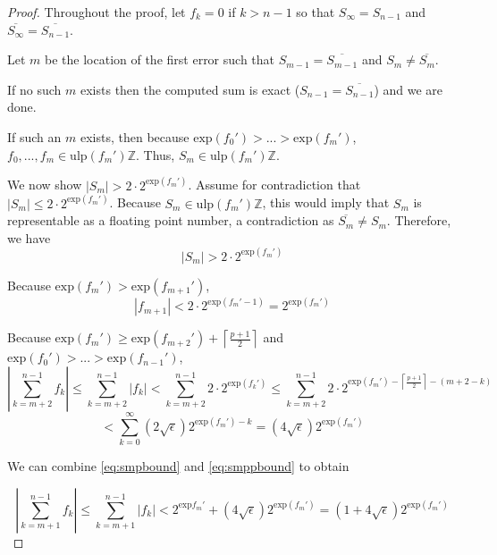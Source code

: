 \documentclass[12pt]{article}
\providecommand{\ceil}[1]{\left \lceil #1 \right \rceil }
\providecommand{\Z}{\ensuremath{\mathbb{Z}}}
\providecommand{\exp}{\ensuremath{\text{exp}}}
\providecommand{\ulp}{\ensuremath{\text{ulp}}}
\theoremstyle{definition}
\numberwithin{equation}{section}
\numberwithin{figure}{section}
\begin{document}
    \begin{proof}

      Throughout the proof, let $f_k = 0$ if $k > n - 1$ so that $S_{\infty} = S_{n - 1}$ and $\overline{S_{\infty}} = \overline{S_{n - 1}}$.

      Let $m$ be the location of the first error such that $S_{m - 1} = \overline{S_{m - 1}}$ and $S_{m} \neq \overline{S_{m}}$.

      If no such $m$ exists then the computed sum is exact ($S_{n - 1} = \overline{S_{n - 1}}$) and we are done.

      If such an $m$ exists, then because $\exp(f_0') > ... > \exp(f_m')$, $f_0, ..., f_m \in \ulp(f_m')\Z$. Thus, $S_m \in \ulp(f_m')\Z$.

      We now show $|S_m| > 2 \cdot 2^{\exp(f_m')}$. Assume for contradiction that $|S_m| \leq 2 \cdot 2^{\exp(f_m')}$. Because $S_m \in \ulp(f_m')\Z$, this would imply that $S_m$ is representable as a floating point number, a contradiction as $\overline{S_m} \neq S_m$. Therefore, we have
      \begin{equation}
        |S_m| > 2 \cdot 2^{\exp(f_m')}
        \label{eq:smbound}
      \end{equation}

      Because $\exp(f_m') > \exp(f_{m + 1}')$,
      \begin{equation}
        |f_{m + 1}| < 2\cdot2^{\exp(f_m' - 1)} = 2^{\exp(f_m')}
        \label{eq:smpbound}
      \end{equation}

      Because $\exp(f_m') \geq \exp(f_{m + 2}') + \ceil{\frac{p + 1}{2}}$ and $\exp(f_0') > ... > \exp(f_{n - 1}')$,
      \begin{equation*}
        |\sum \limits_{k = m + 2}^{n - 1} f_k| \leq \sum \limits_{k = m + 2}^{n - 1} |f_k| < \sum \limits_{k = m + 2}^{n - 1} 2 \cdot 2^{\exp(f_k')} \leq \sum \limits_{k = m + 2}^{n - 1} 2 \cdot 2^{\exp(f_m') - \ceil{\frac{p + 1}{2}} - (m + 2 - k)}
      \end{equation*}
      \begin{equation}
        < \sum \limits_{k = 0}^{\infty} (2 \sqrt{\epsilon})2^{\exp(f_m') - k} = (4\sqrt\epsilon)2^{\exp(f_m')}
        \label{eq:smppbound}
      \end{equation}

      We can combine  \eqref{eq:smpbound} and \eqref{eq:smppbound} to obtain

      \begin{equation}
        |\sum\limits_{k = m + 1}^{n - 1} f_k| \leq \sum\limits_{k = m + 1}^{n - 1} |f_k| < 2^{\exp{f_m'}} + (4 \sqrt{\epsilon}) 2^{\exp(f_m')} = (1 + 4 \sqrt\epsilon )2^{\exp(f_m')}
        \label{eq:smsbound}
      \end{equation}


\end{proof}
\end{document}
